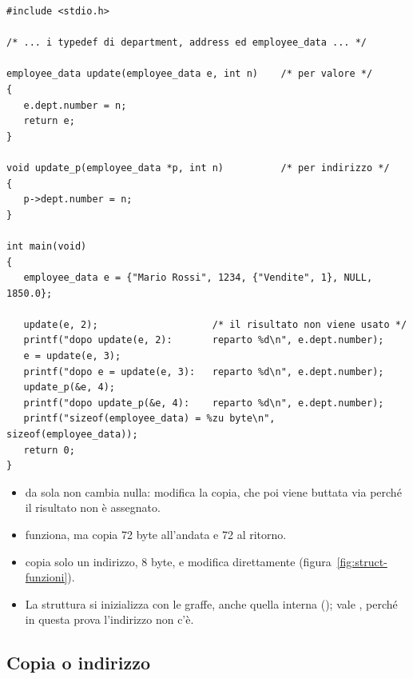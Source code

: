 \begin{affianco}[0.58][c]
\codicepiccolo
\begin{lstlisting}[style=c, name=impiegati.c]
#include <stdio.h>

/* ... i typedef di department, address ed employee_data ... */

employee_data update(employee_data e, int n)    /* per valore */
{
   e.dept.number = n;
   return e;
}

void update_p(employee_data *p, int n)          /* per indirizzo */
{
   p->dept.number = n;
}

int main(void)
{
   employee_data e = {"Mario Rossi", 1234, {"Vendite", 1}, NULL, 1850.0};

   update(e, 2);                    /* il risultato non viene usato */
   printf("dopo update(e, 2):       reparto %d\n", e.dept.number);
   e = update(e, 3);
   printf("dopo e = update(e, 3):   reparto %d\n", e.dept.number);
   update_p(&e, 4);
   printf("dopo update_p(&e, 4):    reparto %d\n", e.dept.number);
   printf("sizeof(employee_data) = %zu byte\n", sizeof(employee_data));
   return 0;
}
\end{lstlisting}
\risultato
{}
\end{affianco}

\begin{itemize}
  \item {} da sola non cambia nulla: modifica la copia, che
        poi viene buttata via perché il risultato non è assegnato.
  \item {} funziona, ma copia 72 byte all'andata e 72
        al ritorno.
  \item {} copia solo un indirizzo, 8 byte, e modifica
         direttamente (figura~\ref{fig:struct-funzioni}).
  \item La struttura si inizializza con le graffe, anche quella interna
        ();  vale , perché in
        questa prova l'indirizzo non c'è.
\end{itemize}

\subsection{Copia o indirizzo}

